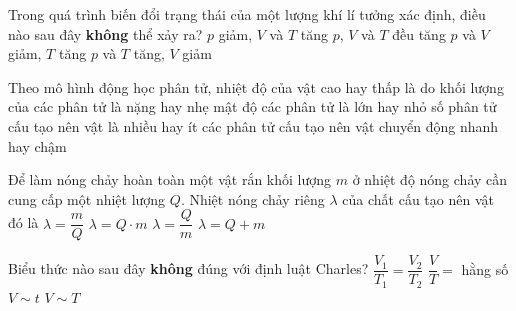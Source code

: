 	\begin{ex}%
		Trong quá trình biến đổi trạng thái của một lượng khí lí tưởng xác định, điều nào sau đây \textbf{không} thể xảy ra?
		\choice
		{$p$ giảm, $V$ và $T$ tăng}
		{$p$, $V$ và $T$ đều tăng}
		{\True $p$ và $V$ giảm, $T$ tăng}
		{$p$ và $T$ tăng, $V$ giảm}
	\end{ex}

	\begin{ex}%
		Theo mô hình động học phân tử, nhiệt độ của vật cao hay thấp là do
		\choice
		{khối lượng của các phân tử là nặng hay nhẹ}
		{mật độ các phân tử là lớn hay nhỏ}
		{số phân tử cấu tạo nên vật là nhiều hay ít}
		{\True các phân tử cấu tạo nên vật chuyển động nhanh hay chậm}
	\end{ex}

	\begin{ex}%
		Để làm nóng chảy hoàn toàn một vật rắn khối lượng $m$ ở nhiệt độ nóng chảy cần cung cấp một nhiệt lượng $Q$. Nhiệt nóng chảy riêng $\lambda$ của chất cấu tạo nên vật đó là
		\choice
		{$\lambda=\dfrac{m}{Q}$}
		{$\lambda=Q\cdot m$}
		{\True $\lambda=\dfrac{Q}{m}$}
		{$\lambda=Q+m$}
	\end{ex}

	\begin{ex}%
		Biểu thức nào sau đây \textbf{không} đúng với định luật Charles?
		\choice
		{$\dfrac{V_1}{T_1}=\dfrac{V_2}{T_2}$}
		{$\dfrac{V}{T}=$ hằng số}
		{\True $V\sim t$}
		{$V\sim T$}
	\end{ex}

